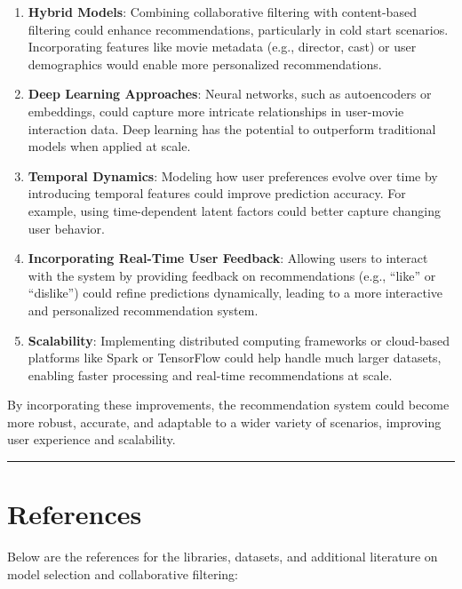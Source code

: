\documentclass[
]{article}
\begin{document}
\begin{enumerate}
\def\labelenumi{\arabic{enumi}.}
\item
  \textbf{Hybrid Models}: Combining collaborative filtering with
  content-based filtering could enhance recommendations, particularly in
  cold start scenarios. Incorporating features like movie metadata
  (e.g., director, cast) or user demographics would enable more
  personalized recommendations.
\item
  \textbf{Deep Learning Approaches}: Neural networks, such as
  autoencoders or embeddings, could capture more intricate relationships
  in user-movie interaction data. Deep learning has the potential to
  outperform traditional models when applied at scale.
\item
  \textbf{Temporal Dynamics}: Modeling how user preferences evolve over
  time by introducing temporal features could improve prediction
  accuracy. For example, using time-dependent latent factors could
  better capture changing user behavior.
\item
  \textbf{Incorporating Real-Time User Feedback}: Allowing users to
  interact with the system by providing feedback on recommendations
  (e.g., ``like'' or ``dislike'') could refine predictions dynamically,
  leading to a more interactive and personalized recommendation system.
\item
  \textbf{Scalability}: Implementing distributed computing frameworks or
  cloud-based platforms like Spark or TensorFlow could help handle much
  larger datasets, enabling faster processing and real-time
  recommendations at scale.
\end{enumerate}

By incorporating these improvements, the recommendation system could
become more robust, accurate, and adaptable to a wider variety of
scenarios, improving user experience and scalability.

\begin{center}\rule{0.5\linewidth}{0.5pt}\end{center}

\section{References}\label{references}

Below are the references for the libraries, datasets, and additional
literature on model selection and collaborative filtering:
\end{document}
